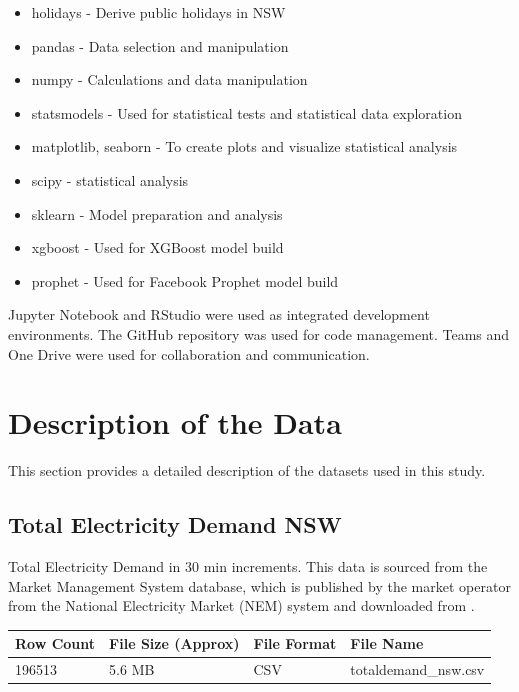 \documentclass[mstat,12pt]{unswthesis}
\begin{document}
\begin{itemize}
  \item holidays - Derive public holidays in NSW 
  \item pandas - Data selection and manipulation
  \item numpy - Calculations and data manipulation
  \item statsmodels - Used for statistical tests and statistical data exploration
  \item matplotlib, seaborn - To create plots and visualize statistical analysis
  \item scipy - statistical analysis
  \item sklearn - Model preparation and analysis
  \item xgboost - Used for XGBoost model build
  \item prophet - Used for Facebook Prophet model build
\end{itemize}

Jupyter Notebook and RStudio were used as integrated development
environments. The GitHub repository was used for code management. Teams
and One Drive were used for collaboration and communication.

\hypertarget{description-of-the-data}{%
\section{Description of the Data}\label{description-of-the-data}}

This section provides a detailed description of the datasets used in
this study.

\hypertarget{total-electricity-demand-nsw}{%
\subsection{Total Electricity Demand
NSW}\label{total-electricity-demand-nsw}}

Total Electricity Demand in 30 min increments. This data is sourced from
the Market Management System database, which is published by the market
operator from the National Electricity Market (NEM) system and
downloaded from \cite{UNSW_project}.

\begin{table}[h]
\tiny
\begin{tabular}{@{}|l|l|l|l|@{}}
\toprule
\textbf{Row Count} & \textbf{File Size (Approx)} & \textbf{File Format} & \textbf{File Name}   \\ \midrule
196513             & 5.6 MB                      & CSV                  & totaldemand\_nsw.csv \\ \bottomrule
\end{tabular}
\end{table}
\end{document}

